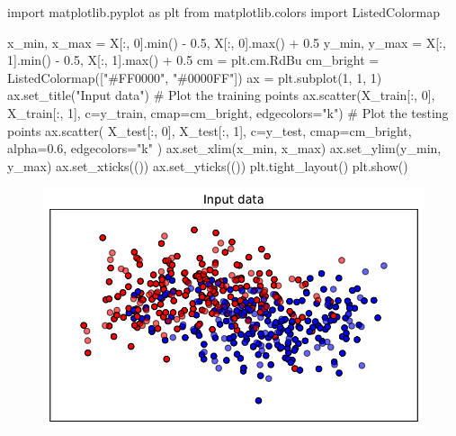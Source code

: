 \documentclass[
  letterpaper,
  DIV=11,
  numbers=noendperiod]{scrreprt}
\newenvironment{Shaded}{\begin{snugshade}}{\end{snugshade}}
\newcommand{\BuiltInTok}[1]{\textcolor[rgb]{0.00,0.23,0.31}{#1}}
\newcommand{\CommentTok}[1]{\textcolor[rgb]{0.37,0.37,0.37}{#1}}
\newcommand{\DecValTok}[1]{\textcolor[rgb]{0.68,0.00,0.00}{#1}}
\newcommand{\FloatTok}[1]{\textcolor[rgb]{0.68,0.00,0.00}{#1}}
\newcommand{\ImportTok}[1]{\textcolor[rgb]{0.00,0.46,0.62}{#1}}
\newcommand{\NormalTok}[1]{\textcolor[rgb]{0.00,0.23,0.31}{#1}}
\newcommand{\OperatorTok}[1]{\textcolor[rgb]{0.37,0.37,0.37}{#1}}
\newcommand{\StringTok}[1]{\textcolor[rgb]{0.13,0.47,0.30}{#1}}
\begin{document}
\begin{Shaded}
\begin{Highlighting}[]
\ImportTok{import}\NormalTok{ matplotlib.pyplot }\ImportTok{as}\NormalTok{ plt}
\ImportTok{from}\NormalTok{ matplotlib.colors }\ImportTok{import}\NormalTok{ ListedColormap}

\NormalTok{x\_min, x\_max }\OperatorTok{=}\NormalTok{ X[:, }\DecValTok{0}\NormalTok{].}\BuiltInTok{min}\NormalTok{() }\OperatorTok{{-}} \FloatTok{0.5}\NormalTok{, X[:, }\DecValTok{0}\NormalTok{].}\BuiltInTok{max}\NormalTok{() }\OperatorTok{+} \FloatTok{0.5}
\NormalTok{y\_min, y\_max }\OperatorTok{=}\NormalTok{ X[:, }\DecValTok{1}\NormalTok{].}\BuiltInTok{min}\NormalTok{() }\OperatorTok{{-}} \FloatTok{0.5}\NormalTok{, X[:, }\DecValTok{1}\NormalTok{].}\BuiltInTok{max}\NormalTok{() }\OperatorTok{+} \FloatTok{0.5}
\NormalTok{cm }\OperatorTok{=}\NormalTok{ plt.cm.RdBu}
\NormalTok{cm\_bright }\OperatorTok{=}\NormalTok{ ListedColormap([}\StringTok{"\#FF0000"}\NormalTok{, }\StringTok{"\#0000FF"}\NormalTok{])}
\NormalTok{ax }\OperatorTok{=}\NormalTok{ plt.subplot(}\DecValTok{1}\NormalTok{, }\DecValTok{1}\NormalTok{, }\DecValTok{1}\NormalTok{)}
\NormalTok{ax.set\_title(}\StringTok{"Input data"}\NormalTok{)}
\CommentTok{\# Plot the training points}
\NormalTok{ax.scatter(X\_train[:, }\DecValTok{0}\NormalTok{], X\_train[:, }\DecValTok{1}\NormalTok{], c}\OperatorTok{=}\NormalTok{y\_train, cmap}\OperatorTok{=}\NormalTok{cm\_bright, edgecolors}\OperatorTok{=}\StringTok{"k"}\NormalTok{)}
\CommentTok{\# Plot the testing points}
\NormalTok{ax.scatter(}
\NormalTok{    X\_test[:, }\DecValTok{0}\NormalTok{], X\_test[:, }\DecValTok{1}\NormalTok{], c}\OperatorTok{=}\NormalTok{y\_test, cmap}\OperatorTok{=}\NormalTok{cm\_bright, alpha}\OperatorTok{=}\FloatTok{0.6}\NormalTok{, edgecolors}\OperatorTok{=}\StringTok{"k"}
\NormalTok{)}
\NormalTok{ax.set\_xlim(x\_min, x\_max)}
\NormalTok{ax.set\_ylim(y\_min, y\_max)}
\NormalTok{ax.set\_xticks(())}
\NormalTok{ax.set\_yticks(())}
\NormalTok{plt.tight\_layout()}
\NormalTok{plt.show()}
\end{Highlighting}
\end{Shaded}

\begin{figure}[H]

{\centering \includegraphics{10_spot_hpt_sklearn_classification_files/figure-pdf/cell-5-output-1.pdf}

}

\end{figure}
\end{document}
